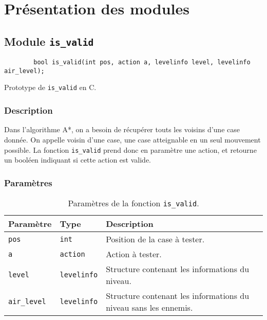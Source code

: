 \chapter{Présentation des modules}
\label{chap:presentation-modules}

\section{Module \texttt{is\_valid}}

\begin{listing}[!htpb]
    \begin{verbatim}
        bool is_valid(int pos, action a, levelinfo level, levelinfo air_level);
    \end{verbatim}
    \caption{Prototype de \texttt{is\_valid} en C.}
    \label{listing:c-is_valid-prototype}
\end{listing}

\subsection{Description}

Dans l'algorithme A*, on a besoin de récupérer touts les voisins d'une case donnée.
On appelle voisin d'une case, une case atteignable en un seul mouvement possible.
\newline\newline
La fonction \texttt{is\_valid} prend donc en paramètre une action, et retourne un booléen indiquant si cette action est valide.

\subsection{Paramètres}

\begin{table}[!htpb]
    \label{tab:parameters-is_valid}
    \begin{tabularx}{\textwidth}{lXX}
        \toprule
        \textbf{Paramètre} & \textbf{Type} & \textbf{Description} \\
        \midrule
        \texttt{pos} & \texttt{int} & Position de la case à tester. \\
        \texttt{a} & \texttt{action} & Action à tester. \\
        \texttt{level} & \texttt{levelinfo} & Structure contenant les informations du niveau. \\
        \texttt{air\_level} & \texttt{levelinfo} & Structure contenant les informations du niveau sans les ennemis. \\
        \bottomrule
    \end{tabularx}
    \caption{Paramètres de la fonction \texttt{is\_valid}.}
\end{table}

